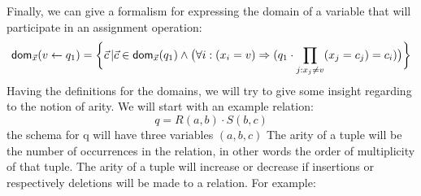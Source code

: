 \documentclass[12pt]{article}
\begin{document}
Finally, we can give a formalism for expressing the domain of a variable that will participate in an assignment operation:
\begin{equation*}
\text{\textsf{dom}{}}_{\vec{x}}(v\gets q_{1})=\bigg\{\vec{c}\,|\vec{c}\in\text{\textsf{dom}{}}_{\vec{x}}(q_{1})\land \big(\forall i:(x_{i}=v)\Rightarrow(q_{1}\cdot\prod_{j:x_{j}\neq v } (x_{j}=c_{j})=c_{i})\big)\bigg\}
\end{equation*}
Having the definitions for the domains, we will try to give some insight regarding to the notion of arity. We will start with an example relation: $$q=R(a,b)\cdot S(b,c)$$ the schema for q will have three variables $(a,b,c)$ The arity of a tuple will be the number of occurrences in the relation, in other words the order of multiplicity of that tuple. The arity of a tuple will increase or decrease if insertions or respectively deletions will be made to a relation. For example:
\end{document}
